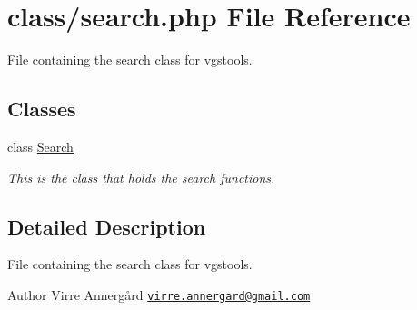 \hypertarget{search_8php}{}\section{class/search.php File Reference}
\label{search_8php}


File containing the search class for vgstools.  


\subsection*{Classes}
\begin{DoxyCompactItemize}
\item 
class \hyperlink{class_search}{Search}
\begin{DoxyCompactList}\small\item\em This is the class that holds the search functions. \end{DoxyCompactList}\end{DoxyCompactItemize}


\subsection{Detailed Description}
File containing the search class for vgstools. 

\begin{DoxyAuthor}{Author}
Virre Annergård \href{mailto:virre.annergard@gmail.com}{\tt virre.\+annergard@gmail.\+com} 
\end{DoxyAuthor}
